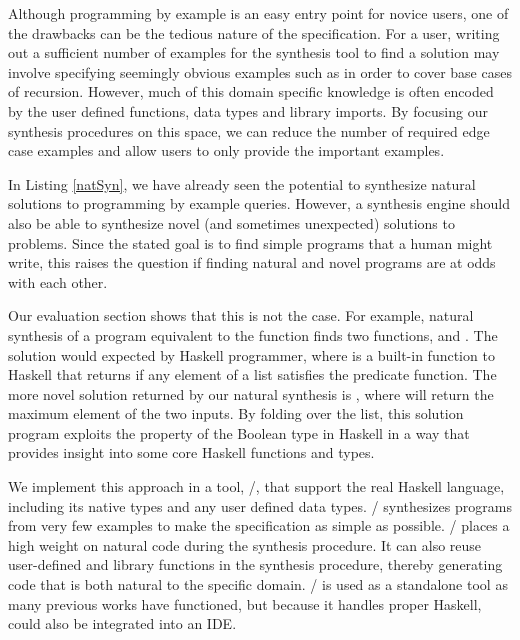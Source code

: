 Although programming by example is an easy entry point for novice users, one of the drawbacks can be the tedious nature of the specification.
For a user, writing out a sufficient number of examples for the synthesis tool to find a solution may involve
  specifying seemingly obvious examples such as \codeinline{[]->[]} in order to cover base cases of recursion.
However, much of this domain specific knowledge is often encoded by the user defined functions, data types and library imports.
By focusing our synthesis procedures on this space, we can reduce the number of required edge case examples and allow users to only provide the important examples.

In Listing \ref{natSyn}, we have already seen the potential to synthesize natural solutions to programming by example queries.
However, a synthesis engine should also be able to synthesize novel (and sometimes unexpected) solutions to problems.
Since the stated goal is to find simple programs that a human might write, this raises the question if finding natural and novel programs are at odds with each other.

Our evaluation section shows that this is not the case.
For example, natural synthesis of a program equivalent to the  function finds two functions,  and .
The  solution would expected by Haskell programmer, where  is a built-in function to Haskell that returns  if any element of a list satisfies the predicate function.
The more novel solution returned by our natural synthesis is , where  will return the maximum element of the two inputs.
By folding over the list, this solution program exploits the  property of the Boolean type in Haskell in a way that provides insight into some core Haskell functions and types.

We implement this approach in a tool, \ourTool/, that support the real Haskell language, including its native types and any user defined data types.
\ourTool/ synthesizes programs from very few examples to make the specification as simple as possible.
\ourTool/ places a high weight on natural code during the synthesis procedure.
It can also reuse user-defined and library functions in the synthesis procedure, thereby generating code that is both natural to the specific domain.
\ourTool/ is used as a standalone tool as many previous works have functioned, but because it handles proper Haskell, could also be integrated into an IDE.


